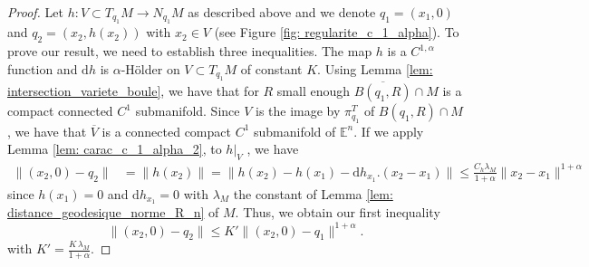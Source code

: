 \documentclass[11pt,reqno,a4paper]{article}%
\theoremstyle{definition}
\theoremstyle{remark}
\renewcommand{\leq}{\leqslant}
\renewcommand{\d}{\mathrm{d}}
\newcommand{\E}{\mathbb{E}}
\renewcommand{\d}{\mathrm{d}}
\begin{document}
\begin{proof}
Let $h : V \subset T_{q_1}M \to N_{q_1}M$ as described above and we denote $q_1 = (x_1,0)$ and $q_2 = (x_2 , h(x_2))$ with $x_2 \in V$ (see Figure \ref{fig: regularite_c_1_alpha}).
To prove our result, we need to establish three inequalities.
The map $h$ is a $C^{1,\alpha}$ function and $\d h$ is $\alpha$-Hölder on $V \subset T_{q_1}M$ of constant $K$.
Using Lemma \ref{lem: intersection_variete_boule}, we have that for $R$ small enough $\overline{B(q_1,R)} \cap M$ is a compact connected $C^1$ submanifold.
Since $V$ is the image by $\pi_{q_1}^T$ of $B(q_1,R) \cap M$, we have that $\overline{V}$ is a connected compact $C^1$ submanifold of $\E^n$.
If we apply Lemma \ref{lem: carac_c_1_alpha_2}, to $h |_{V}$ , we have
\begin{align*}
   \| (x_2,0) - q_2 \| &= \| h(x_2) \| =\| h(x_2) - h(x_1) - \d h_{x_1}.(x_2-x_1) \| \leq  \frac{C_h \lambda_M}{1+\alpha} \| x_2 - x_1 \|^{1+\alpha}   
\end{align*}
since $h(x_1) = 0$ and $\d h_{x_1} = 0$ with $\lambda_M$ the constant of Lemma \ref{lem: distance_geodesique_norme_R_n} of $M$.
Thus, we obtain our first inequality
\begin{equation} \label{eq: inegalite_1}
     \| (x_2,0) - q_2 \| \leq  K' \| (x_2,0) - q_1\|^{1+\alpha}.
\end{equation}
with $K' = \frac{K\, \lambda_M}{1+\alpha}$.


\end{proof}
\end{document}
